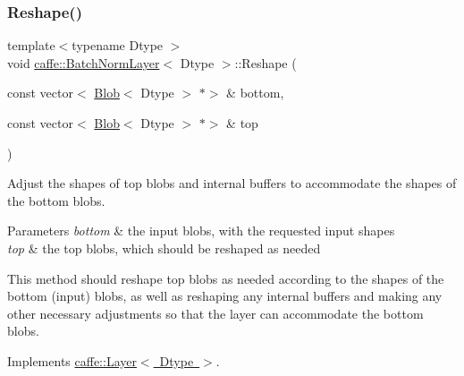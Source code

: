\subsubsection{\texorpdfstring{Reshape()}{Reshape()}\hspace{0.1cm}{\footnotesize\ttfamily [1/2]}}
{\footnotesize\ttfamily template$<$typename Dtype $>$ \\
void \mbox{\hyperlink{classcaffe_1_1_batch_norm_layer}{caffe\+::\+Batch\+Norm\+Layer}}$<$ Dtype $>$\+::Reshape (\begin{DoxyParamCaption}\item[{const vector$<$ \mbox{\hyperlink{classcaffe_1_1_blob}{Blob}}$<$ Dtype $>$ $\ast$$>$ \&}]{bottom,  }\item[{const vector$<$ \mbox{\hyperlink{classcaffe_1_1_blob}{Blob}}$<$ Dtype $>$ $\ast$$>$ \&}]{top }\end{DoxyParamCaption})\hspace{0.3cm}{\ttfamily [virtual]}}



Adjust the shapes of top blobs and internal buffers to accommodate the shapes of the bottom blobs. 


\begin{DoxyParams}{Parameters}
{\em bottom} & the input blobs, with the requested input shapes \\
\hline
{\em top} & the top blobs, which should be reshaped as needed\\
\hline
\end{DoxyParams}
This method should reshape top blobs as needed according to the shapes of the bottom (input) blobs, as well as reshaping any internal buffers and making any other necessary adjustments so that the layer can accommodate the bottom blobs. 

Implements \mbox{\hyperlink{classcaffe_1_1_layer_a7fe981e8af8d93d587acf2a952be563d}{caffe\+::\+Layer$<$ Dtype $>$}}.

\mbox{\label{classcaffe_1_1_batch_norm_layer_ab5cc20592aaa28fb2c41fabe842da3fc}} 
